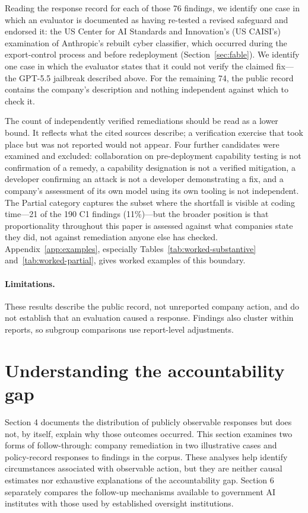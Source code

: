 \documentclass{article}
\begin{document}
Reading the response record for each of those 76 findings, we identify one case in which an evaluator is documented as having re-tested a revised safeguard and endorsed it: the US Center for AI Standards and Innovation's (US CAISI's) examination of Anthropic's rebuilt cyber classifier, which occurred during the export-control process and before redeployment (Section~\ref{sec:fable}). We identify one case in which the evaluator states that it could not verify the claimed fix---the GPT-5.5 jailbreak described above. For the remaining 74, the public record contains the company's description and nothing independent against which to check it.

The count of independently verified remediations should be read as a lower bound. It reflects what the cited sources describe; a verification exercise that took place but was not reported would not appear. Four further candidates were examined and excluded: collaboration on pre-deployment capability testing is not confirmation of a remedy, a capability designation is not a verified mitigation, a developer confirming an attack is not a developer demonstrating a fix, and a company's assessment of its own model using its own tooling is not independent. The Partial category captures the subset where the shortfall is visible at coding time---21 of the 190 C1 findings (11\%)---but the broader position is that proportionality throughout this paper is assessed against what companies state they did, not against remediation anyone else has checked. Appendix~\ref{app:examples}, especially Tables~\ref{tab:worked-substantive} and~\ref{tab:worked-partial}, gives worked examples of this boundary.

\paragraph{Limitations.} These results describe the public record, not unreported company action, and do not establish that an evaluation caused a response. Findings also cluster within reports, so subgroup comparisons use report-level adjustments.

\section{Understanding the accountability gap}\label{sec:interpretation}
Section 4 documents the distribution of publicly observable responses but does not, by itself, explain why those outcomes occurred. This section examines two forms of follow-through: company remediation in two illustrative cases and policy-record responses to findings in the corpus. These analyses help identify circumstances associated with observable action, but they are neither causal estimates nor exhaustive explanations of the accountability gap. Section 6 separately compares the follow-up mechanisms available to government AI institutes with those used by established oversight institutions.
\end{document}
